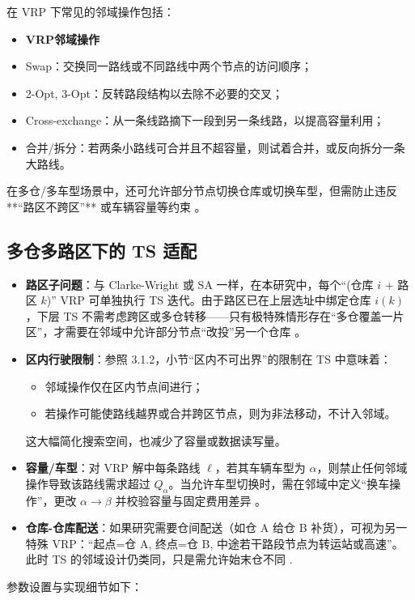 \documentclass[12pt,a4paper,twoside]{ctexbook}
\begin{document}
    在 VRP 下常见的邻域操作包括：
    \begin{itemize}
    \item \textbf{VRP邻域操作}
        \item Swap：交换同一路线或不同路线中两个节点的访问顺序；
        \item 2-Opt, 3-Opt：反转路段结构以去除不必要的交叉；
        \item Cross-exchange：从一条线路摘下一段到另一条线路，以提高容量利用；
        \item 合并/拆分：若两条小路线可合并且不超容量，则试着合并，或反向拆分一条大路线。
    \end{itemize}
    在多仓/多车型场景中，还可允许部分节点切换仓库或切换车型，但需防止违反**“路区不跨区”** 或车辆容量等约束 \cite{golden2008vehicle}。

\subsection{多仓多路区下的 TS 适配}

\begin{itemize}
    \item \textbf{路区子问题}：与 Clarke-Wright 或 SA 一样，在本研究中，每个“(仓库 $i$ + 路区 $k$)” VRP 可单独执行 TS 迭代。由于路区已在上层选址中绑定仓库 $i(k)$，下层 TS 不需考虑跨区或多仓转移——只有极特殊情形存在“多仓覆盖一片区”，才需要在邻域中允许部分节点“改投”另一个仓库 \cite{vidal2013hybrid}。
    \item \textbf{区内行驶限制}：参照 3.1.2，小节“区内不可出界”的限制在 TS 中意味着：
    \begin{itemize}
        \item 邻域操作仅在区内节点间进行；
        \item 若操作可能使路线越界或合并跨区节点，则为非法移动，不计入邻域。
    \end{itemize}
    这大幅简化搜索空间，也减少了容量或数据读写量。
    \item \textbf{容量/车型}：对 VRP 解中每条路线 $\ell$，若其车辆车型为 $\alpha$，则禁止任何邻域操作导致该路线需求超过 $Q_\alpha$。当允许车型切换时，需在邻域中定义“换车操作”，更改 $\alpha \to \beta$ 并校验容量与固定费用差异 \cite{toth2014vehicle}。
    \item \textbf{仓库-仓库配送}：如果研究需要仓间配送（如仓 A 给仓 B 补货），可视为另一特殊 VRP：“起点=仓 A, 终点=仓 B, 中途若干路段节点为转运站或高速”。此时 TS 的邻域设计仍类同，只是需允许始末仓不同 \cite{salazar2013multi}.
\end{itemize}
参数设置与实现细节如下：
\end{document}
